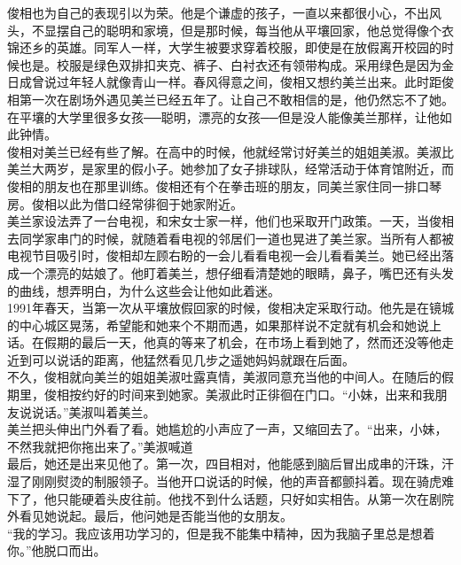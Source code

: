 俊相也为自己的表现引以为荣。他是个谦虚的孩子，一直以来都很小心，不出风头，不显摆自己的聪明和家境，但是那时候，每当他从平壤回家，他总觉得像个衣锦还乡的英雄。同军人一样，大学生被要求穿着校服，即使是在放假离开校园的时候也是。校服是绿色双排扣夹克、裤子、白衬衣还有领带构成。采用绿色是因为金日成曾说过年轻人就像青山一样。春风得意之间，俊相又想约美兰出来。此时距俊相第一次在剧场外遇见美兰已经五年了。让自己不敢相信的是，他仍然忘不了她。在平壤的大学里很多女孩──聪明，漂亮的女孩──但是没人能像美兰那样，让他如此钟情。\\

俊相对美兰已经有些了解。在高中的时候，他就经常讨好美兰的姐姐美淑。美淑比美兰大两岁，是家里的假小子。她参加了女子排球队，经常活动于体育馆附近，而俊相的朋友也在那里训练。俊相还有个在拳击班的朋友，同美兰家住同一排口琴房。俊相以此为借口经常徘徊于她家附近。\\

美兰家设法弄了一台电视，和宋女士家一样，他们也采取开门政策。一天，当俊相去同学家串门的时候，就随着看电视的邻居们一道也晃进了美兰家。当所有人都被电视节目吸引时，俊相却左顾右盼的一会儿看看电视一会儿看看美兰。她已经出落成一个漂亮的姑娘了。他盯着美兰，想仔细看清楚她的眼睛，鼻子，嘴巴还有头发的曲线，想弄明白，为什么这些会让他如此着迷。\\

1991年春天，当第一次从平壤放假回家的时候，俊相决定采取行动。他先是在镜城的中心城区晃荡，希望能和她来个不期而遇，如果那样说不定就有机会和她说上话。在假期的最后一天，他真的等来了机会，在市场上看到她了，然而还没等他走近到可以说话的距离，他猛然看见几步之遥她妈妈就跟在后面。\\

不久，俊相就向美兰的姐姐美淑吐露真情，美淑同意充当他的中间人。在随后的假期里，俊相按约好的时间来到她家。美淑此时正徘徊在门口。“小妹，出来和我朋友说说话。”美淑叫着美兰。\\

美兰把头伸出门外看了看。她尴尬的小声应了一声，又缩回去了。“出来，小妹，不然我就把你拖出来了。”美淑喊道\\

最后，她还是出来见他了。第一次，四目相对，他能感到脑后冒出成串的汗珠，汗湿了刚刚熨烫的制服领子。当他开口说话的时候，他的声音都颤抖着。现在骑虎难下了，他只能硬着头皮往前。他找不到什么话题，只好如实相告。从第一次在剧院外看见她说起。最后，他问她是否能当他的女朋友。\\

“我的学习。我应该用功学习的，但是我不能集中精神，因为我脑子里总是想着你。”他脱口而出。\\

